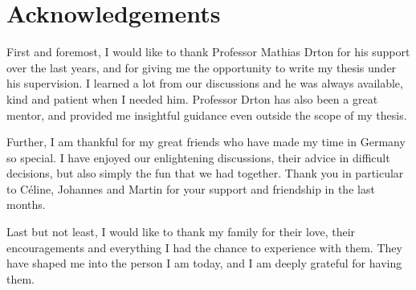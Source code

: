 \section*{Acknowledgements}

First and foremost, I would like to thank Professor Mathias Drton for his support over the last years, and for giving me the opportunity to write my thesis under his supervision. I learned a lot from our discussions and he was always available, kind and patient when I needed him. Professor Drton has also been a great mentor, and provided me insightful guidance even outside the scope of my thesis.

Further, I am thankful for my great friends who have made my time in Germany so special. I have enjoyed our enlightening discussions, their advice in difficult decisions, but also simply the fun that we had together. Thank you in particular to C\'eline, Johannes and Martin for your support and friendship in the last months.

Last but not least, I would like to thank my family for their love, their encouragements and everything I had the chance to experience with them. They have shaped me into the person I am today, and I am deeply grateful for having them.

